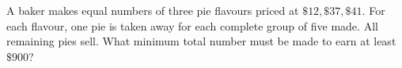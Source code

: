 A baker makes equal numbers of three pie flavours priced at $\$12,\$37,\$41$. For each flavour, one pie is taken away for each complete group of five made. All remaining pies sell. What minimum total number must be made to earn at least $\$900$?
